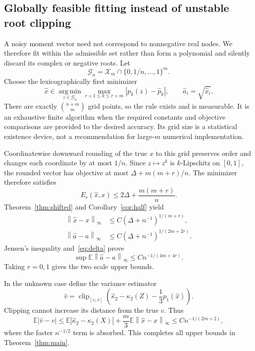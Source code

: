 \documentclass[11pt,a4paper]{article}
\numberwithin{equation}{section}
\theoremstyle{definition}
\theoremstyle{remark}
\newcommand{\E}{\mathbb E}
\newcommand{\norm}[1]{\left\lVert#1\right\rVert}
\newcommand{\clip}{\operatorname{clip}}
\newcommand{\kap}{\kappa}
\newcommand{\Xs}{\mathcal X_m}
\begin{document}
\subsection{Globally feasible fitting instead of unstable root clipping}
A noisy moment vector need not correspond to nonnegative real nodes. We
therefore fit within the admissible set rather than form a polynomial and
silently discard its complex or negative roots. Let
\begin{equation}
 \mathcal G_n=\Xs\cap\{0,1/n,\ldots,1\}^m.
\end{equation}
Choose the lexicographically first minimizer
\begin{equation}
 \widehat x\in\operatorname*{arg\,min}_{z\in\mathcal G_n}
 \max_{r+1\le k\le r+m}|p_k(z)-\widehat p_k|,
 \qquad \widehat a_i=\sqrt{\widehat x_i}.
 \label{eq:fit}
\end{equation}
There are exactly $\binom{n+m}{m}$ grid points, so the rule exists and is
measurable. It is an exhaustive finite algorithm when the required constants
and objective comparisons are provided to the desired accuracy. Its grid
size is a statistical existence device, not a recommendation for large-$m$
numerical implementation.

Coordinatewise downward rounding of the true $x$ to this grid preserves
order and changes each coordinate by at most $1/n$. Since $z\mapsto z^k$ is
$k$-Lipschitz on $[0,1]$, the rounded vector has objective at most
$\Delta+m(m+r)/n$. The minimizer therefore satisfies
\begin{equation}
 E_r(\widehat x,x)\le 2\Delta+\frac{m(m+r)}n.
 \label{eq:fitresidual}
\end{equation}
Theorem~\ref{thm:shifted} and Corollary~\ref{cor:half} yield
\begin{align}
 \norm{\widehat x-x}_\infty
 &\le C(\Delta+n^{-1})^{1/(m+r)},
 \label{eq:xestbound}\\
 \norm{\widehat a-a}_\infty
 &\le C(\Delta+n^{-1})^{1/(2m+2r)}.
 \label{eq:aestbound}
\end{align}
Jensen's inequality and~\eqref{eq:delta} prove
\begin{equation}
 \sup\E\norm{\widehat a-a}_\infty\le Cn^{-1/(4m+4r)}.
 \label{eq:aupper}
\end{equation}
Taking $r=0,1$ gives the two scale upper bounds.

In the unknown case define the variance estimator
\begin{equation}
 \widehat v=\clip_{[\underline v,\overline v]}
 \left(\widehat\kap_2-\kap_2(Z)-\frac13p_1(\widehat x)\right).
 \label{eq:vestimator}
\end{equation}
Clipping cannot increase its distance from the true $v$. Thus
\begin{equation}
 \E|\widehat v-v|
 \le\E|\widehat\kap_2-\kap_2(X)|
        +\frac m3\E\norm{\widehat x-x}_\infty
 \le C n^{-1/(2m+2)},
 \label{eq:vupper}
\end{equation}
where the faster $n^{-1/2}$ term is absorbed. This completes all upper bounds
in Theorem~\ref{thm:main}.
\end{document}
